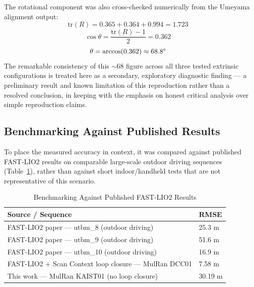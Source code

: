 \documentclass[conference]{IEEEtran}
\begin{document}
The rotational component was also cross-checked numerically from the Umeyama alignment output:
\begin{equation}
\mathrm{tr}(R) = 0.365 + 0.364 + 0.994 = 1.723
\label{eq:trace}
\end{equation}
\begin{equation}
\cos\theta = \frac{\mathrm{tr}(R) - 1}{2} = 0.362
\label{eq:costheta}
\end{equation}
\begin{equation}
\theta = \arccos(0.362) \approx 68.8\text{\textdegree}
\label{eq:theta}
\end{equation}
The remarkable consistency of this $\sim$68\textdegree{} figure across all three tested extrinsic configurations is treated here as a secondary, exploratory diagnostic finding --- a preliminary result and known limitation of this reproduction rather than a resolved conclusion, in keeping with the emphasis on honest critical analysis over simple reproduction claims.

\subsection{Benchmarking Against Published Results}
\label{sec:benchmark}
To place the measured accuracy in context, it was compared against published FAST-LIO2 results on comparable large-scale outdoor driving sequences (Table~\ref{tab:benchmark}), rather than against short indoor/handheld tests that are not representative of this scenario.

\begin{table}[htbp]
\caption{Benchmarking Against Published FAST-LIO2 Results}
\label{tab:benchmark}
\centering
\begin{tabular}{p{}p{}}
\toprule
\textbf{Source / Sequence} & \textbf{RMSE} \\
\midrule
FAST-LIO2 paper --- utbm\_8 (outdoor driving) & 25.3 m \\
FAST-LIO2 paper --- utbm\_9 (outdoor driving) & 51.6 m \\
FAST-LIO2 paper --- utbm\_10 (outdoor driving) & 16.9 m \\
FAST-LIO2 + Scan Context loop closure --- MulRan DCC01 & 7.58 m \\
This work --- MulRan KAIST01 (no loop closure) & 30.19 m \\
\bottomrule
\end{tabular}
\end{table}
\end{document}
